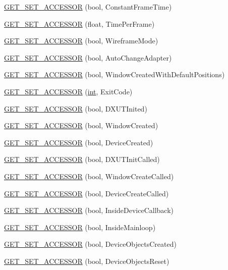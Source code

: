 \begin{DoxyCompactItemize}
\item 
\hyperlink{class_d_x_u_t_state_a467c802afbcd8e51a8ccf569107eed64}{GET\_\-SET\_\-ACCESSOR} (bool, ConstantFrameTime)
\item 
\hyperlink{class_d_x_u_t_state_a2cf24d275f714d043aa07c7f84f057fe}{GET\_\-SET\_\-ACCESSOR} (float, TimePerFrame)
\item 
\hyperlink{class_d_x_u_t_state_a59311ccadc02bef1fcce1ee052ceecb9}{GET\_\-SET\_\-ACCESSOR} (bool, WireframeMode)
\item 
\hyperlink{class_d_x_u_t_state_a2bb10450426c21bb4a86a8b979d9afca}{GET\_\-SET\_\-ACCESSOR} (bool, AutoChangeAdapter)
\item 
\hyperlink{class_d_x_u_t_state_af8afc1f310b2c7e1a68aa6730c142b6c}{GET\_\-SET\_\-ACCESSOR} (bool, WindowCreatedWithDefaultPositions)
\item 
\hyperlink{class_d_x_u_t_state_a00c1bce1dc49ad37f1d7a1d517bfe2c1}{GET\_\-SET\_\-ACCESSOR} (\hyperlink{_d_x_u_tgui_8cpp_a2d77ed03302b6978834ee3b6f57837fb}{int}, ExitCode)
\item 
\hyperlink{class_d_x_u_t_state_a7170f07f98ca52e76967d166e7fc5323}{GET\_\-SET\_\-ACCESSOR} (bool, DXUTInited)
\item 
\hyperlink{class_d_x_u_t_state_a1c6c3de8f9aae7efa32d603d18953c13}{GET\_\-SET\_\-ACCESSOR} (bool, WindowCreated)
\item 
\hyperlink{class_d_x_u_t_state_a80fe40845dbc6d77ee04510e15c929c0}{GET\_\-SET\_\-ACCESSOR} (bool, DeviceCreated)
\item 
\hyperlink{class_d_x_u_t_state_af968f67a37e3c409770d52cbc5e68882}{GET\_\-SET\_\-ACCESSOR} (bool, DXUTInitCalled)
\item 
\hyperlink{class_d_x_u_t_state_a5a0a83f318432262f0d1936453b5b776}{GET\_\-SET\_\-ACCESSOR} (bool, WindowCreateCalled)
\item 
\hyperlink{class_d_x_u_t_state_a6dfe7e675d3521ea6c945041a4e8ebeb}{GET\_\-SET\_\-ACCESSOR} (bool, DeviceCreateCalled)
\item 
\hyperlink{class_d_x_u_t_state_ae57476aa86bbfa1a7cc419d387a2d0ee}{GET\_\-SET\_\-ACCESSOR} (bool, InsideDeviceCallback)
\item 
\hyperlink{class_d_x_u_t_state_a6474dc67d3b1b2572a8bb2476709b516}{GET\_\-SET\_\-ACCESSOR} (bool, InsideMainloop)
\item 
\hyperlink{class_d_x_u_t_state_a07b477d9aa86b43b42ed3178c15e8482}{GET\_\-SET\_\-ACCESSOR} (bool, DeviceObjectsCreated)
\item 
\hyperlink{class_d_x_u_t_state_a4c31ee243c293f73584d675041eaea2b}{GET\_\-SET\_\-ACCESSOR} (bool, DeviceObjectsReset)

\end{DoxyCompactItemize}
